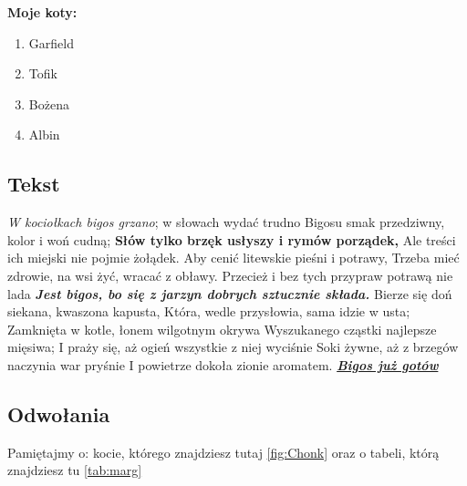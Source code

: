 \textbf{Moje koty:}
\begin{enumerate}
    \item Garfield
    \item Tofik
    \item Bożena
    \item Albin
\end{enumerate}

\subsection{Tekst}
\emph{W kociołkach bigos grzano}; w słowach wydać trudno
Bigosu smak przedziwny, kolor i woń cudną;
\textbf{Słów tylko brzęk usłyszy i rymów porządek,}
Ale treści ich miejski nie pojmie żołądek.
Aby cenić litewskie pieśni i potrawy,
Trzeba mieć zdrowie, na wsi żyć, wracać z obławy.
Przecież i bez tych przypraw potrawą nie lada
\textbf{\textit{Jest bigos, bo się z jarzyn dobrych sztucznie składa.}}
Bierze się doń siekana, kwaszona kapusta,
Która, wedle przysłowia, sama idzie w usta;
Zamknięta w kotle, łonem wilgotnym okrywa
Wyszukanego cząstki najlepsze mięsiwa;
I praży się, aż ogień wszystkie z niej wyciśnie
Soki żywne, aż z brzegów naczynia war pryśnie
I powietrze dokoła zionie aromatem.
\underline{\textbf{\textit{Bigos już gotów}}}


\subsection{Odwołania}
Pamiętajmy o: kocie, którego znajdziesz tutaj \ref{fig:Chonk} oraz o tabeli, którą znajdziesz tu \ref{tab:marg}

